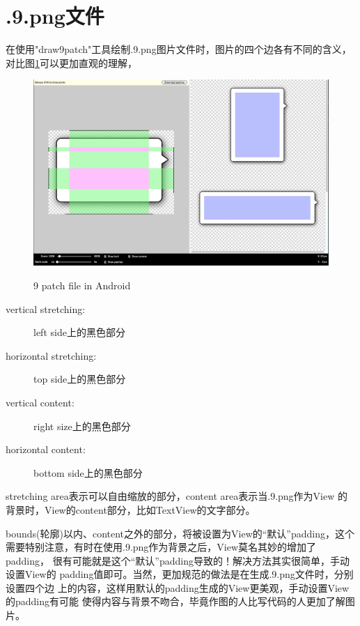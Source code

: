 ﻿\section[Nine patch]{.9.png文件}
在使用"draw9patch"工具绘制.9.png图片文件时，图片的四个边各有不同的含义，
对比图\ref{fig:draw9patch}可以更加直观的理解，
\begin{figure}
  \centering
  \includegraphics[width=.8\textwidth]{picturedir/draw9patch.png}\\
  \caption{9 patch file in Android}\label{fig:draw9patch}
\end{figure}

\begin{description}
  \item[vertical stretching: ] left side上的黑色部分
  \item[horizontal stretching: ] top side上的黑色部分
  \item[vertical content: ] right size上的黑色部分
  \item[horizontal content: ] bottom side上的黑色部分
\end{description}
stretching area表示可以自由缩放的部分，content area表示当.9.png作为View
的背景时，View的content部分，比如TextView的文字部分。

bounds(轮廓)以内、content之外的部分，将被设置为View的“默认”padding，这个
需要特别注意，有时在使用.9.png作为背景之后，View莫名其妙的增加了padding，
很有可能就是这个“默认”padding导致的！解决方法其实很简单，手动设置View的
padding值即可。当然，更加规范的做法是在生成.9.png文件时，分别设置四个边
上的内容，这样用默认的padding生成的View更美观，手动设置View的padding有可能
使得内容与背景不吻合，毕竟作图的人比写代码的人更加了解图片。